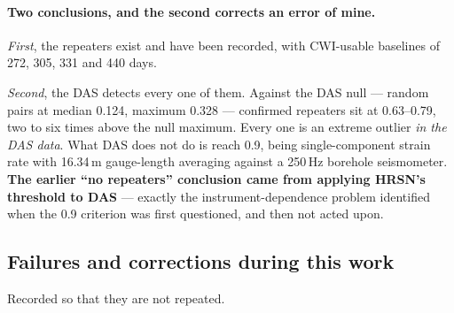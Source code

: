 \documentclass[11pt]{article}
\begin{document}
\paragraph{Two conclusions, and the second corrects an error of mine.}

\emph{First}, the repeaters exist and have been recorded, with CWI-usable
baselines of 272, 305, 331 and 440 days.

\emph{Second}, the DAS detects every one of them. Against the DAS null --- random
pairs at median 0.124, maximum 0.328 --- confirmed repeaters sit at 0.63--0.79,
two to six times above the null maximum. Every one is an extreme outlier
\emph{in the DAS data}. What DAS does not do is reach 0.9, being single-component
strain rate with 16.34\,m gauge-length averaging against a 250\,Hz borehole
seismometer. \textbf{The earlier ``no repeaters'' conclusion came from applying
HRSN's threshold to DAS} --- exactly the instrument-dependence problem identified
when the 0.9 criterion was first questioned, and then not acted upon.

\subsection{Failures and corrections during this work}

Recorded so that they are not repeated.
\end{document}
